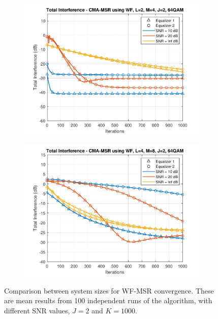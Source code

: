 \begin{figure}
\begin{subfigure}[b]{0.45\textwidth}
		\includegraphics[width=\linewidth]{./figs/BF_WF_MSR_TI_64QAM_L=2_M=4_J=2_K=1000.pdf}
		\label{fig:wf_msr_ti64_24}
	\end{subfigure}
	\begin{subfigure}[b]{0.45\textwidth}
		\includegraphics[width=\linewidth]{./figs/BF_WF_MSR_TI_64QAM_L=4_M=8_J=2_K=1000.pdf}
		\label{fig:wf_msr_ti64_48}
	\end{subfigure}
	\caption{Comparison between system sizes for WF-MSR convergence. These are mean results from 100 independent runs of the algorithm, with different SNR values, $J=2$ and $K=1000$.}
	\label{fig:CMA_WF_msr_size_qpsk}
\end{figure}